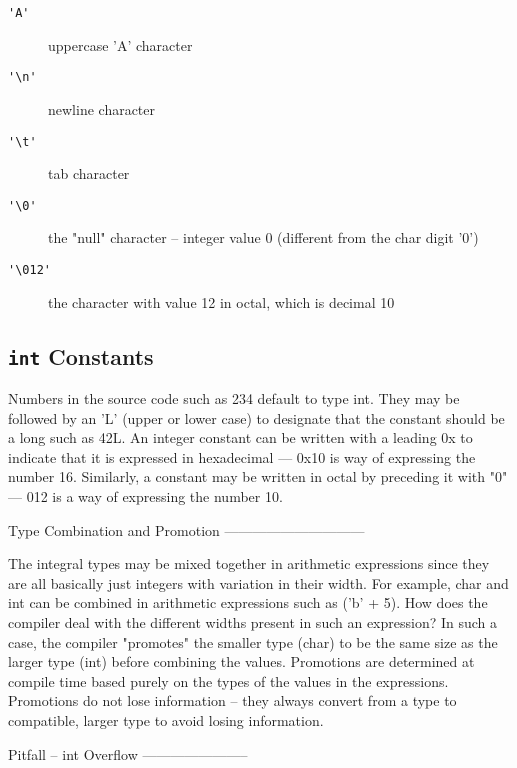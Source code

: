 \begin{description}
\item[\lstinline{'A'}] 
    uppercase 'A' character

\item[\lstinline{'\n'}]
    newline character

\item[\lstinline{'\t'}]
    tab character

\item[\lstinline{'\0'}]
    the "null" character -- integer value 0 (different from the char digit '0')

\item[\lstinline{'\012'}]
    the character with value 12 in octal, which is decimal 10
\end{description}

\subsection{\lstinline{int} Constants}

Numbers in the source code such as 234 default to type int. They may be followed by an 'L' (upper or lower case) to designate that the constant should be a long such as 42L. An integer constant can be written with a leading 0x to indicate that it is expressed in hexadecimal --- 0x10 is way of expressing the number 16. Similarly, a constant may be written in octal by preceding it with "0" --- 012 is a way of expressing the number 10.

Type Combination and Promotion
------------------------------

The integral types may be mixed together in arithmetic expressions since they are all basically just integers with variation in their width. For example, char and int can be combined in arithmetic expressions such as ('b' + 5). How does the compiler deal with the different widths present in such an expression? In such a case, the compiler "promotes" the smaller type (char) to be the same size as the larger type (int) before combining the values. Promotions are determined at compile time based purely on the types of the values in the expressions. Promotions do not lose information -- they always convert from a type to compatible, larger type to avoid losing information.

Pitfall -- int Overflow
-----------------------

